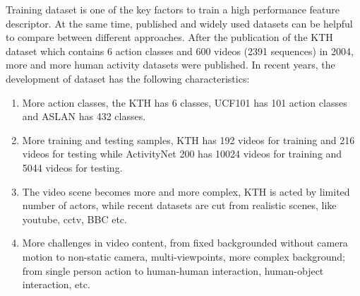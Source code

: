 Training dataset is one of the key factors to train a high performance feature descriptor. At the same time, published and widely used datasets can be helpful to compare between different approaches. After the publication of the KTH \cite{kth} dataset which contains 6 action classes and 600 videos (2391 sequences) in 2004, more and more human activity datasets were published. In recent years, the development of dataset has the following characteristics:
\begin{enumerate}
	\item More action classes, the KTH has 6 classes, UCF101 \cite{ucf101} has 101 action classes and ASLAN \cite{aslan} has 432 classes.
	\item More training and testing samples, KTH has 192 videos for training and 216 videos for testing while ActivityNet \cite{activitynet200} 200 has 10024 videos for training and 5044 videos for testing.
	\item The video scene becomes more and more complex, KTH is acted by limited number of actors, while recent datasets are cut from realistic scenes, like youtube, cctv, BBC etc.
	\item More challenges in video content, from fixed backgrounded without camera motion to  non-static camera, multi-viewpoints, more complex background; from single person action to  human-human interaction, human-object interaction, etc.    
\end{enumerate}  

